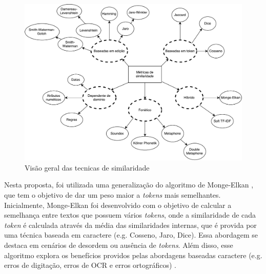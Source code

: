 \begin{figure}[!ht]
	\centering
	\includegraphics[width=1\textwidth]{./imagens/similarity-metrics.pdf}
	\caption{Visão geral das tecnicas de similaridade}
	\label{fig:tecnicas_similaridade}
\end{figure}




Nesta proposta, foi utilizada uma generalização do algoritmo de Monge-Elkan \cite{monge1996field}, que tem o objetivo de dar um peso maior a \textit{tokens} mais semelhantes. Inicialmente, Monge-Elkan foi desenvolvido com o objetivo de calcular a semelhança entre textos que possuem vários \textit{tokens}, onde a similaridade de cada \textit{token} é calculada através da média das similaridades internas, que é provida por uma técnica baseada em caractere (e.g. Cosseno, Jaro, Dice). Essa abordagem se destaca em cenários de desordem ou ausência de \textit{tokens}. Além disso, esse algoritmo explora os benefícios providos pelas abordagens baseadas caractere (e.g. erros de digitação, erros de OCR e erros ortográficos) \cite{jimenez2009generalized}.

